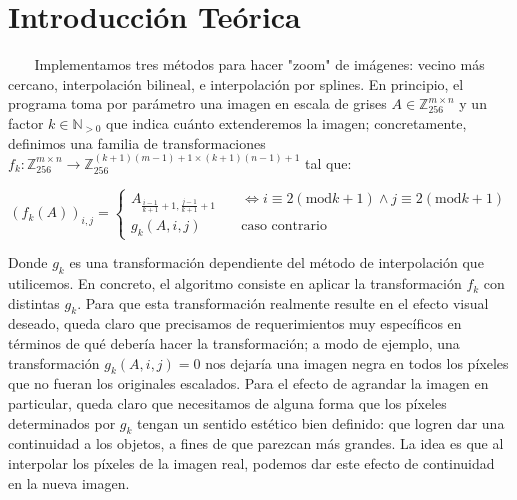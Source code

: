 \documentclass{article}
\begin{document}
{} %

\grupo{     
\\
}
 
\maketitle

\pagebreak

\section*{Introducción Teórica}{}

$\ $ $\ $ $\ $ $\ $Implementamos tres métodos para hacer "zoom" de imágenes: vecino más cercano, interpolación bilineal, e interpolación por splines. En principio, el programa toma por parámetro una imagen en escala de grises $A \in \mathbb{Z}_{256}^{m \times n}$ y un factor $k \in \mathbb{N}_{>0}$ que indica cuánto extenderemos la imagen; concretamente, definimos una familia de transformaciones $f_k : \mathbb{Z}_{256}^{m \times n} \to \mathbb{Z}_{256}^{(k+1)(m-1)+1 \times (k+1)(n-1)+1}$ tal que:

$$(f_k(A))_{i, j} =
    \begin{cases}
        A_{\frac{i - 1}{k + 1} + 1, \frac{j - 1}{k + 1} + 1} & \quad \iff i \equiv 2 (\text{mod} k+1) \wedge j \equiv 2 (\text{mod} k+1) \\
        g_k(A, i, j) & \quad \text{caso contrario}
    \end{cases}$$

Donde $g_k$ es una transformación dependiente del método de interpolación que utilicemos. En concreto, el algoritmo consiste en aplicar la transformación $f_k$ con distintas $g_k$. Para que esta transformación realmente resulte en el efecto visual deseado, queda claro que precisamos de requerimientos muy específicos en términos de qué debería hacer la transformación; a modo de ejemplo, una transformación $g_k(A, i, j) = 0$ nos dejaría una imagen negra en todos los píxeles que no fueran los originales escalados. Para el efecto de agrandar la imagen en particular, queda claro que necesitamos de alguna forma que los píxeles determinados por $g_k$ tengan un sentido estético bien definido: que logren dar una continuidad a los objetos, a fines de que parezcan más grandes. La idea es que al interpolar los píxeles de la imagen real, podemos dar este efecto de continuidad en la nueva imagen.
\end{document}

